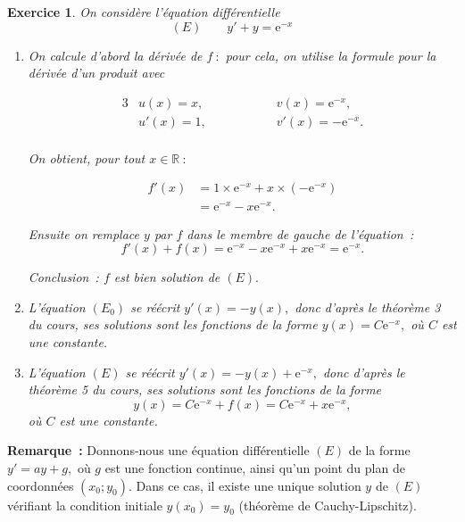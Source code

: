 \documentclass[10pt]{article}
\newtheorem{exo}{Exercice}
\begin{document}
\begin{exo}

On considère l'équation différentielle
\[(E)\qquad y'+y=\text{e}^{-x}\]



\begin{enumerate}
\item On calcule d'abord la dérivée de $f~:$ pour cela, on utilise la formule pour la dérivée d'un produit avec

\begin{alignat*}{3}
&u(x)=x,&& \hspace{1cm}&&v(x)=\text{e}^{-x}, \\
& u'(x)=1,&& &&v'(x)=-\text{e}^{-x}.\\
\end{alignat*}

On obtient, pour tout $x\in \mathbb{R}~:$

\begin{align*}
f'(x)&=1\times \text{e}^{-x}+x\times \left(-\text{e}^{-x}\right)\\
&=\text{e}^{-x}-x\text{e}^{-x}.
\end{align*}

\medskip

Ensuite on remplace $y$ par $f$ dans le membre de gauche de l'équation~:
\[f'(x)+f(x)=\text{e}^{-x}-x\text{e}^{-x}+x\text{e}^{-x}=\text{e}^{-x}.\]

Conclusion~: $f$ est bien solution de $(E).$

\item L'équation $\left(E_0\right)$ se réécrit $y'(x)=-y(x),$ donc d'après le théorème 3 du cours, ses solutions sont les fonctions de la forme $y(x)=C\text{e}^{-x},$ où $C$ est une constante.

\item L'équation $\left(E\right)$ se réécrit $y'(x)=-y(x)+\text{e}^{-x},$ donc d'après le théorème 5 du cours, ses solutions sont les fonctions de la forme 
\[y(x)=C\text{e}^{-x}+f(x)=C\text{e}^{-x}+x\text{e}^{-x},\] où $C$ est une constante.

\end{enumerate}

\end{exo}



\textbf{Remarque~:} Donnons-nous une équation différentielle $(E)$ de la forme $y'=ay+g,$ où $g$ est une fonction continue, ainsi qu'un point du plan de coordonnées $\left(x_0;y_0\right).$ Dans ce cas, il existe une unique solution $y$ de $(E)$ vérifiant la condition initiale $y\left(x_0\right)=y_0$ (théorème de Cauchy-Lipschitz).
\end{document}
